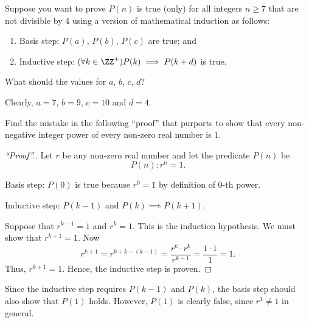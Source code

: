 \begin{problem}
    Suppose you want to prove $P(n)$ is true (only) for all integers $n \geq 7$ that are not divisible by 4 using a version of mathematical induction as follows:

    \renewcommand{\theenumi}{\roman{enumi}.}
    \begin{enumerate}
        \item Basis step: $P(a)$, $P(b)$, $P(c)$ are true; and
        \item Inductive step: $(\forall k \in \ZZ^+) P(k) \implies P(k+d)$ is true.
    \end{enumerate}
    \renewcommand{\theenumi}{(\alph{enumi})}

    What should the values for $a$, $b$, $c$, $d$?
\end{problem}
\begin{solution}
    Clearly, $a = 7$, $b = 9$, $c = 10$ and $d = 4$.
\end{solution}

\begin{problem}
    Find the mistake in the following ``proof'' that purports to show that every non-negative integer power of every non-zero real number is 1.

    \begin{proof}[``Proof''.]
        Let $r$ be any non-zero real number and let the predicate $P(n)$ be \[P(n) : r^n = 1.\]
        
        Basis step: $P(0)$ is true because $r^0 = 1$ by definition of 0-th power.

        Inductive step: $P(k-1)$ and $P(k) \implies P(k+1)$.

        Suppose that $r^{k-1} = 1$ and $r^k = 1$. This is the induction hypothesis. We must show that $r^{k+1} = 1$. Now \[r^{k+1} = r^{k + k - (k-1)} = \frac{r^k \cdot r^k}{r^{k-1}} = \frac{1 \cdot 1}{1} = 1.\] Thus, $r^{k+1} = 1$. Hence, the inductive step is proven.
    \end{proof}
\end{problem}
\begin{solution}
    Since the inductive step requires $P(k-1)$ and $P(k)$, the basis step should also show that $P(1)$ holds. However, $P(1)$ is clearly false, since $r^1 \neq 1$ in general.
\end{solution}